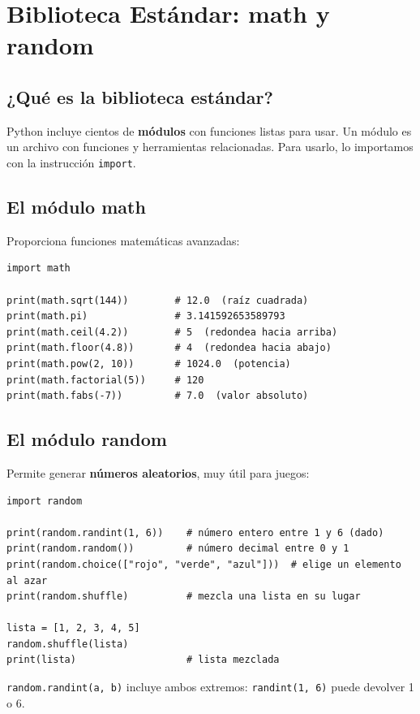 \documentclass[11pt,a4paper]{article}
\begin{document}
\section{Biblioteca Estándar: math y random}

\subsection{¿Qué es la biblioteca estándar?}

Python incluye cientos de \textbf{módulos} con funciones listas para usar. Un módulo es un archivo con funciones y herramientas relacionadas. Para usarlo, lo importamos con la instrucción \texttt{import}.

\subsection{El módulo math}

Proporciona funciones matemáticas avanzadas:

\begin{cajaEjemplo}
\begin{lstlisting}[style=pythonStyle, caption={Usando math}]
import math

print(math.sqrt(144))        # 12.0  (raíz cuadrada)
print(math.pi)               # 3.141592653589793
print(math.ceil(4.2))        # 5  (redondea hacia arriba)
print(math.floor(4.8))       # 4  (redondea hacia abajo)
print(math.pow(2, 10))       # 1024.0  (potencia)
print(math.factorial(5))     # 120
print(math.fabs(-7))         # 7.0  (valor absoluto)
\end{lstlisting}
\end{cajaEjemplo}

\subsection{El módulo random}

Permite generar \textbf{números aleatorios}, muy útil para juegos:

\begin{cajaEjemplo}
\begin{lstlisting}[style=pythonStyle, caption={Usando random}]
import random

print(random.randint(1, 6))    # número entero entre 1 y 6 (dado)
print(random.random())         # número decimal entre 0 y 1
print(random.choice(["rojo", "verde", "azul"]))  # elige un elemento al azar
print(random.shuffle)          # mezcla una lista en su lugar

lista = [1, 2, 3, 4, 5]
random.shuffle(lista)
print(lista)                   # lista mezclada
\end{lstlisting}

\begin{cajaRecuerda}
\texttt{random.randint(a, b)} incluye ambos extremos: \texttt{randint(1, 6)} puede devolver 1 o 6.
\end{cajaRecuerda}
\end{cajaEjemplo}
\end{document}
